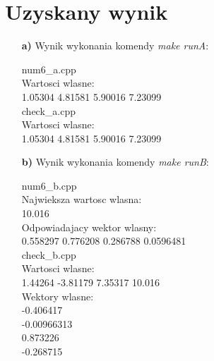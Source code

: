 \documentclass{article}
\begin{document}
  \section{Uzyskany wynik}
  \begin{enumerate}
    \item[\bf{a)}] Wynik wykonania komendy \textit{make runA}:
    \begin{center}
      \begin{tcolorbox}
        num6\_a.cpp\\
        Wartosci wlasne:\\
        1.05304 4.81581 5.90016 7.23099\\

        check\_a.cpp\\
        Wartosci wlasne:\\
        1.05304 4.81581 5.90016 7.23099
      \end{tcolorbox}
    \end{center}

    \item[\bf{b)}] Wynik wykonania komendy \textit{make runB}:
    \begin{center}
      \begin{tcolorbox}
        num6\_b.cpp\\
        Najwieksza wartosc wlasna:\\
        10.016\\
        Odpowiadajacy wektor wlasny:\\
        0.558297 0.776208 0.286788 0.0596481\\ 

        check\_b.cpp\\
        Wartosci wlasne:\\ 
        1.44264 -3.81179 7.35317 10.016\\
        Wektory wlasne:\\ 
        -0.406417\\ 
        -0.00966313\\ 
        0.873226\\ 
        -0.268715\\
      \end{tcolorbox}
    \end{center}
  \end{enumerate}
\end{document}
